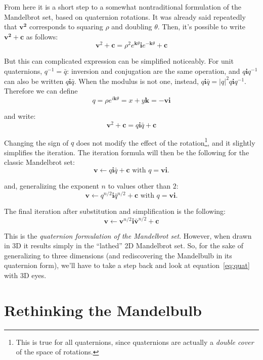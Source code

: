\documentclass{article}
\let\vec\mathbf
\begin{document}
From here it is a short step to a somewhat nontraditional formulation of
the Mandelbrot set, based on quaternion rotations.  It was already said
repeatedly that $\vec{v^2}$ corresponds to squaring $\rho$ and doubling
$\theta$.  Then, it's possible to write $\vec{v^2+c}$ as follows:
\begin{equation*}
\vec{v}^2+\vec{c}=\rho^2 e^{\vec{k}\theta} \vec{i} e^{-\vec{k}\theta}+\vec{c}
\end{equation*}

But this can complicated expression can be simplified
noticeably.  For unit quaternions, $q^{-1}=\bar q$:
inversion and conjugation are the same operation, and $q\vec{i}q^{-1}$ can
also be written $q\vec{i}\bar q$.  When the modulus is not one, instead,
$q\vec{i}\bar q = |q|^2 q\vec{i}q^{-1}$.  Therefore we can define
\begin{equation*}
q = \rho e^{i\vec{k}\theta} = x + y\vec{k} = -\vec{v}\vec{i}
\end{equation*}

\noindent
and write:
\begin{equation*}
\vec{v}^2+\vec{c}=q \vec{i} \bar q+\vec{c}
\end{equation*}

\noindent
Changing the sign of $q$ does not modify the effect of the
rotation\footnote{This is true for all quaternions, since quaternions
  are actually a \emph{double cover} of the space of rotations.}, and
it slightly simplifies the iteration.  The iteration formula will then be
the following for the classic Mandelbrot set:
\begin{equation*}
\vec{v}\leftarrow q \vec{i} \bar q+\vec{c}\text{ with }q=\vec{v}\vec{i}.
\end{equation*}

\noindent
and, generalizing the exponent $n$ to values other than $2$:
\begin{equation}
\label{eq:quat}
\vec{v}\leftarrow q^{n/2} \vec{i} \bar q^{n/2}+\vec{c}\text{ with }q=\vec{v}\vec{i}.
\end{equation}

\noindent
The final iteration after substitution and simplification is the following:
\begin{equation*}
\vec{v}\leftarrow\vec{v}^{n/2} \vec{i} \vec{\bar v}^{n/2}+\vec{c}
\end{equation*}

\noindent
This is the \emph{quaternion formulation of the Mandelbrot set}.  However,
when drawn in 3D it results simply in the ``lathed'' 2D Mandelbrot set.
So, for the sake of generalizing to three dimensions (and rediscovering
the Mandelbulb in its quaternion form), we'll have to take a step back
and look at equation~\ref{eq:quat} with 3D eyes.

\section{Rethinking the Mandelbulb}

\end{document}
